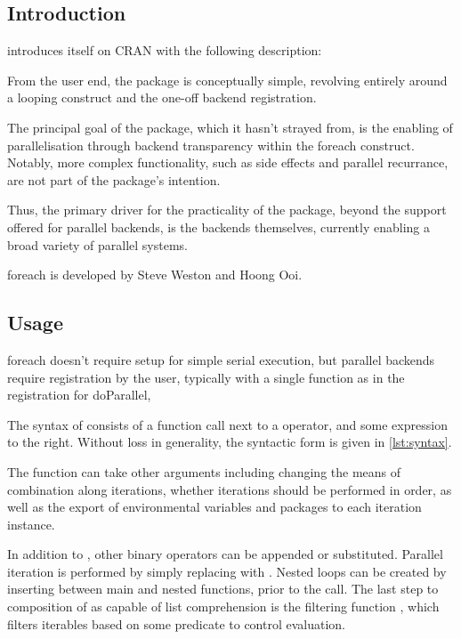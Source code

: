 \subsection{Introduction}\label{sec:foreach-introduction}

 introduces itself on CRAN with the following description:


From the user end, the package is conceptually simple, revolving
entirely around a looping construct and the one-off backend
registration.

The principal goal of the package, which it hasn't strayed from, is the
enabling of parallelisation through backend transparency within the
foreach construct. Notably, more complex functionality, such as side
effects and parallel recurrance, are not part of the package's
intention.

Thus, the primary driver for the practicality of the package, beyond the
support offered for parallel backends, is the backends themselves,
currently enabling a broad variety of parallel systems.

foreach is developed by Steve Weston and Hoong Ooi.

\subsection{Usage}\label{sec:usage}

foreach doesn't require setup for simple serial execution, but parallel
backends require registration by the user, typically with a single
function as in the registration for doParallel, 

The syntax of  consists of a 
 function call next to a  operator, and some expression to the
right\cite{weston19:_using}. Without loss in generality, the syntactic
form is given in \cref{lst:syntax}.


The  function can take other
arguments including changing the means of combination along iterations,
whether iterations should be performed in order, as well as the export
of environmental variables and packages to each iteration instance.

In addition to , other binary operators can be appended
or substituted. Parallel iteration is performed by simply replacing
 with . Nested loops can be created by
inserting  between main and nested  functions,
prior to the  call\cite{weston19:_nestin_loops}. The
last step to composition of  as capable of list comprehension is
the filtering function , which filters iterables based
on some predicate to control evaluation.

